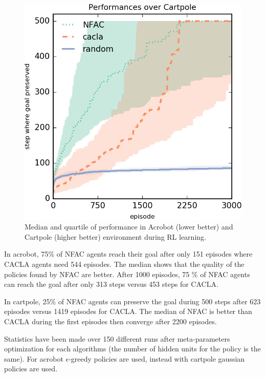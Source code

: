 \begin{figure}[h]
\begin{minipage}{.5\textwidth}
  \includegraphics[width=0.95\linewidth]{result_plotting/cartpole_perf.png}
\end{minipage}
\caption{ \label{fig:actions} Median and quartile of performance in Acrobot (lower better) and Cartpole (higher better) environment during RL learning.}
\end{figure}


In acrobot, 75\% of NFAC agents reach their goal after only 151 episodes where CACLA agents need 544 episodes. The median shows that the quality
of the policies found by NFAC are better. After 1000 episodes, 75 \% of NFAC agents can reach the goal after only 313 steps versus 453 steps for CACLA.

In cartpole, 25\% of NFAC agents can preserve the goal during 500 steps after 623 episodes versus 1419 episodes for CACLA. The median of NFAC is better 
than CACLA during the first episodes then converge after 2200 episodes.

Statistics have been made over 150 different runs after meta-parameters optimization for each algorithms
(the number of hidden units for the policy is the same).
For acrobot $\epsilon$-greedy policies are used, instead with cartpole gaussian policies are used.